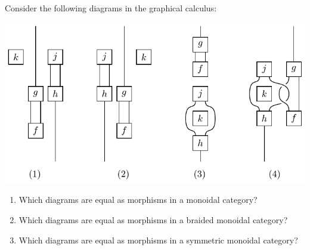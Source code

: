 \begin{exercise}
    Consider the following diagrams in the graphical calculus:

    \centering \includegraphics{monoidal-braided-symmetric-comparison}

    \begin{enumerate}
      \item Which diagrams are equal as morphisms in a monoidal category?
      \item Which diagrams are equal as morphisms in a braided monoidal category?
      \item Which diagrams are equal as morphisms in a symmetric monoidal category?
    \end{enumerate}
\end{exercise}


